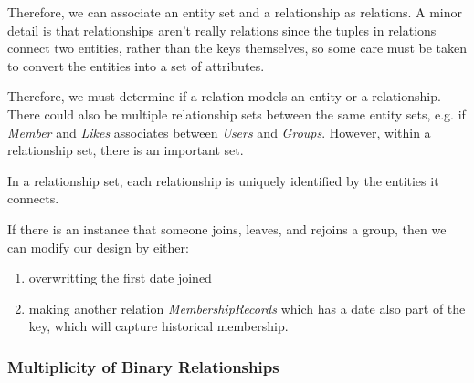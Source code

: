 \documentclass{article}
\begin{document}
    Therefore, we can associate an entity set and a relationship as relations. A minor detail is that relationships aren't really relations since the tuples in relations connect two entities, rather than the keys themselves, so some care must be taken to convert the entities into a set of attributes. 

    Therefore, we must determine if a relation models an entity or a relationship. There could also be multiple relationship sets between the same entity sets, e.g. if \textit{Member} and \textit{Likes} associates between \textit{Users} and \textit{Groups}. However, within a relationship set, there is an important set. 

    \begin{theorem}
      In a relationship set, each relationship is uniquely identified by the entities it connects. 
    \end{theorem}

    If there is an instance that someone joins, leaves, and rejoins a group, then we can modify our design by either: 
    \begin{enumerate}
      \item overwritting the first date joined 
      \item making another relation \textit{MembershipRecords} which has a date also part of the key, which will capture historical membership.  
    \end{enumerate}

    \subsubsection{Multiplicity of Binary Relationships}
\end{document}
